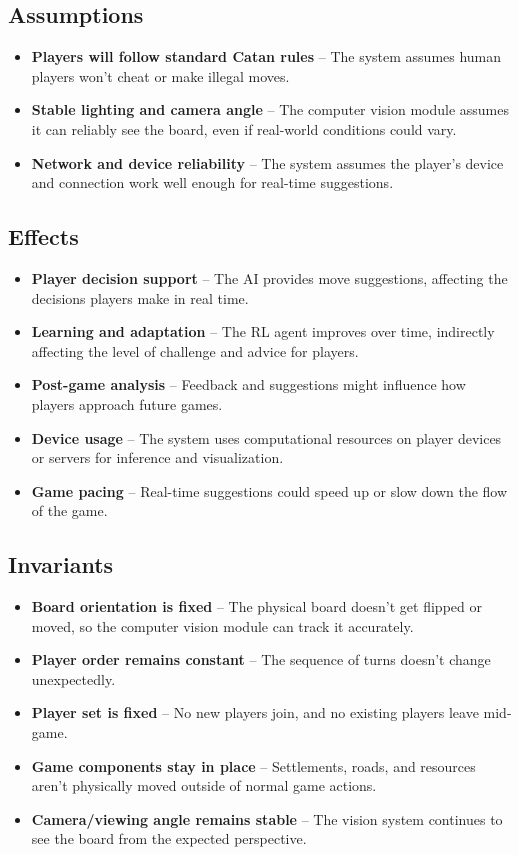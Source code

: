 \documentclass{article}
\begin{document}
\subsection{Assumptions}\label{subsec:assumptions}
\begin{itemize}
    \item \textbf{Players will follow standard Catan rules} – The system assumes human players won’t cheat or make illegal moves.
    \item \textbf{Stable lighting and camera angle} – The computer vision module assumes it can reliably see the board, even if real-world conditions could vary.
    \item \textbf{Network and device reliability} – The system assumes the player’s device and connection work well enough for real-time suggestions.
\end{itemize}

\subsection{Effects}\label{subsec:effects}
\begin{itemize}
    \item \textbf{Player decision support} – The AI provides move suggestions, affecting the decisions players make in real time.
    \item \textbf{Learning and adaptation} – The RL agent improves over time, indirectly affecting the level of challenge and advice for players.
    \item \textbf{Post-game analysis} – Feedback and suggestions might influence how players approach future games.
    \item \textbf{Device usage} – The system uses computational resources on player devices or servers for inference and visualization.
    \item \textbf{Game pacing} – Real-time suggestions could speed up or slow down the flow of the game.
\end{itemize}

\subsection{Invariants}\label{subsec:invariants}
\begin{itemize}
    \item \textbf{Board orientation is fixed} – The physical board doesn’t get flipped or moved, so the computer vision module can track it accurately.
    \item \textbf{Player order remains constant} – The sequence of turns doesn’t change unexpectedly.
    \item \textbf{Player set is fixed} – No new players join, and no existing players leave mid-game.
    \item \textbf{Game components stay in place} – Settlements, roads, and resources aren’t physically moved outside of normal game actions.
    \item \textbf{Camera/viewing angle remains stable} – The vision system continues to see the board from the expected perspective.
\end{itemize}
\end{document}
